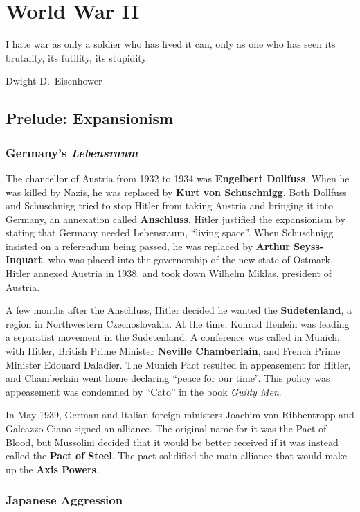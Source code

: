 \chapter{World War II}

\epigraph{%
  I hate war as only a soldier who has lived it can,
  only as one who has seen its brutality, its futility, its stupidity.
}{Dwight D.\ Eisenhower}

\section{Prelude: Expansionism}

\subsection*{Germany's \textit{Lebensraum}}

The chancellor of Austria from 1932 to 1934 was \textbf{Engelbert Dollfuss}.
When he was killed by Nazis, he was replaced by \textbf{Kurt von Schuschnigg}.
Both Dollfuss and Schuschnigg tried to stop Hitler from taking Austria and bringing it into Germany,
an annexation called \textbf{Anschluss}.
Hitler justified the expansionism by stating that Germany needed Lebensraum, ``living space''.
When Schuschnigg insisted on a referendum being passed,
he was replaced by \textbf{Arthur Seyss-Inquart}, who was placed into the governorship of the new state of Ostmark.
Hitler annexed Austria in 1938, and took down Wilhelm Miklas, president of Austria.

A few months after the Anschluss, Hitler decided he wanted the \textbf{Sudetenland},
a region in Northwestern Czechoslovakia.
At the time, Konrad Henlein was leading a separatist movement in the Sudetenland.
A conference was called in Munich, with Hitler,
British Prime Minister \textbf{Neville Chamberlain}, and French Prime Minister Edouard Daladier.
The Munich Pact resulted in appeasement for Hitler,
and Chamberlain went home declaring ``peace for our time''.
This policy was appeasement was condemned by ``Cato'' in the book \textit{Guilty Men}.

In May 1939, German and Italian foreign ministers Joachim von Ribbentropp and Galeazzo Ciano signed an alliance.
The original name for it was the Pact of Blood,
but Mussolini decided that it would be better received if it was instead called the \textbf{Pact of Steel}.
The pact solidified the main alliance that would make up the \textbf{Axis Powers}.

\subsection*{Japanese Aggression}

